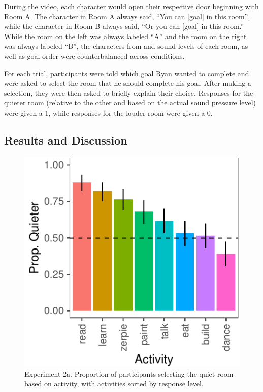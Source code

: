 \documentclass[10pt, letterpaper]{article}
\newenvironment{CodeChunk}{}{}
\begin{document}
During the video, each character would open their respective door
beginning with Room A. The character in Room A always said, ``You can
{[}goal{]} in this room'', while the character in Room B always said,
``Or you can {[}goal{]} in this room.'' While the room on the left was
always labeled ``A'' and the room on the right was always labeled ``B'',
the characters from and sound levels of each room, as well as goal order
were counterbalanced across conditions.

For each trial, participants were told which goal Ryan wanted to
complete and were asked to select the room that he should complete his
goal. After making a selection, they were then asked to briefly explain
their choice. Responses for the quieter room (relative to the other and
based on the actual sound pressure level) were given a 1, while
responses for the louder room were given a 0.

\hypertarget{results-and-discussion-2}{%
\subsection{Results and Discussion}\label{results-and-discussion-2}}

\begin{CodeChunk}
\begin{figure}[t]

{\centering \includegraphics{figs/e2a-bar-1} 

}

\caption[Experiment 2a]{Experiment 2a. Proportion of participants selecting the quiet room based on activity, with activities sorted by response level.}\label{fig:e2a-bar}
\end{figure}
\end{CodeChunk}
\end{document}
